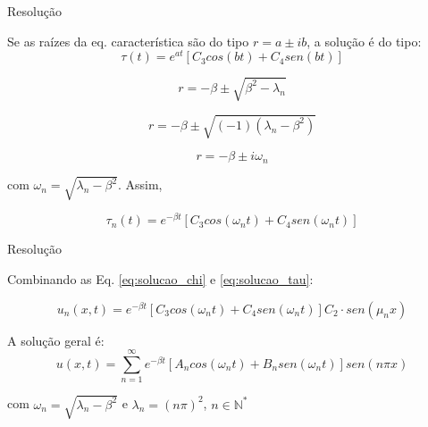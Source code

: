 \documentclass{beamer}
\begin{document}
\begin{frame}{Resolução}

Se as raízes da eq. característica são do tipo $r = a \pm ib$, a solução é do tipo:
\begin{equation}
    \tau(t) = e^{at}\left [C_3 cos (bt) + C_4 sen (bt)\right ] 
\end{equation}


\begin{equation*}
    r = -\beta \pm \sqrt{\beta^2 - \lambda_n} 
\end{equation*}

\begin{equation*}
    r = -\beta \pm \sqrt{(-1) ( \lambda_n - \beta^2)} 
\end{equation*}

\begin{equation*}
    r = -\beta \pm i \omega_n 
\end{equation*}

com $\omega_n = \sqrt{\lambda_n - \beta^2}$. Assim,

\begin{equation}
\label{eq:solucao_tau}
    \tau_n(t) = e^{-\beta t}\left [C_3 cos (\omega_n t) + C_4 sen (\omega_n t)\right ]
\end{equation}

\end{frame}

\begin{frame}{Resolução}

Combinando as Eq. \eqref{eq:solucao_chi} e \eqref{eq:solucao_tau}:

\begin{equation}
\label{eq:solucao_unxt}
    u_n(x, t) = e^{-\beta t}\left [C_3 cos (\omega_n t) + C_4 sen (\omega_n t)\right ]C_2 \cdot sen (\mu_n x)
\end{equation}

\begin{block}{A solução geral é:}
\begin{equation}
\label{eq:solucao_unxt}
    u(x, t) = \sum_{n=1}^{\infty}e^{-\beta t}\left [A_n cos (\omega_n t) + B_n sen (\omega_n t)\right ] sen (n \pi x)
\end{equation}

com $\omega_n = \sqrt{\lambda_n - \beta^2}$ e $\lambda_n = (n \pi)^2$, $ n \in \mathbb{N}^\ast $
\end{block}

\end{frame}
\end{document}
